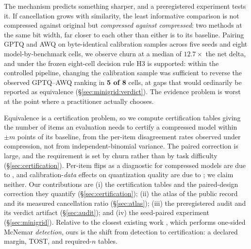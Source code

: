 The mechanism predicts something sharper, and a preregistered experiment tests
it. If cancellation grows with similarity, the least informative comparison is
not compressed against original but \emph{compressed against compressed}: two
methods at the same bit width, far closer to each other than either is to its
baseline. Pairing GPTQ and AWQ on byte-identical calibration samples across five
seeds and eight model-by-benchmark cells, we observe churn at a median of
$12.7\times$ the net delta, and under the frozen eight-cell decision rule H3 is
supported: within the controlled pipeline, changing the calibration sample was
sufficient to reverse the observed GPTQ--AWQ ranking in \textbf{5 of 8} cells,
at gaps that would ordinarily be reported as equivalence
(\S\ref{sec:minigrid:verdict}). The evidence problem is worst at the point where
a practitioner actually chooses.

Equivalence is a certification problem, so we compute certification tables
giving the number of items an evaluation needs to certify a compressed model
within $\pm m$ points of its baseline, from the per-item disagreement rates
observed under compression, not from independent-binomial variance. The paired
correction is large, and the requirement is set by churn rather than by task
difficulty (\S\ref{sec:certification}).
Per-item flips as a diagnostic for compressed models are due to
\citet{dutta2024flips}, and calibration-\emph{data} effects on quantization
quality are due to \citet{williamsaletras2024}; we claim neither. Our
contributions are (i) the certification tables and the paired-design correction
they quantify (\S\ref{sec:certification}); (ii) the atlas of the public record
and its measured cancellation ratio (\S\ref{sec:atlas}); (iii) the preregistered
audit and its verdict artifact (\S\ref{sec:audit}); and (iv) the seed-paired
experiment (\S\ref{sec:minigrid}). Relative to the closest existing work
\citep{llmaccuracystats2026}, which performs one-sided McNemar
\emph{detection}, ours is the shift from detection to certification: a declared
margin, TOST, and required-$n$ tables.

